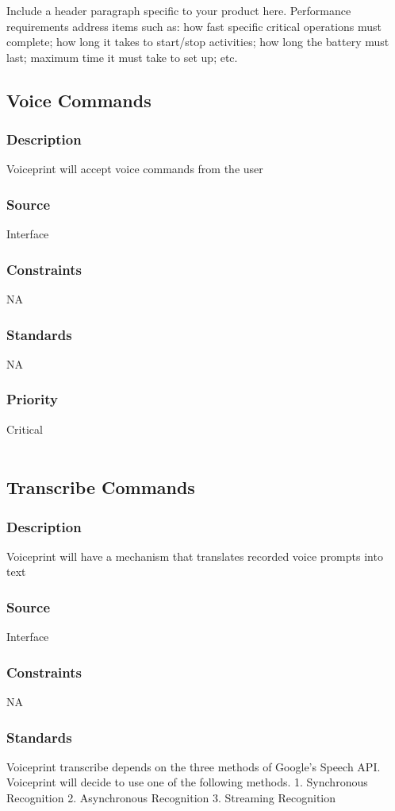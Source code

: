 Include a header paragraph specific to your product here. Performance requirements address items such as: how fast specific critical operations must complete; how long it takes to start/stop activities; how long the battery must last; maximum time it must take to set up; etc.

\subsection{Voice Commands}
\subsubsection{Description}
Voiceprint will accept voice commands from the user
\subsubsection{Source}
Interface
\subsubsection{Constraints}
NA
\subsubsection{Standards}
NA
\subsubsection{Priority}
Critical \\
\\
\subsection{Transcribe Commands}
\subsubsection{Description}
Voiceprint will have a mechanism that translates recorded voice prompts into text
\subsubsection{Source}
Interface
\subsubsection{Constraints}
NA
\subsubsection{Standards}
Voiceprint transcribe depends on the three methods of Google's Speech API. Voiceprint will decide to use one of the following methods.
1. Synchronous Recognition
2. Asynchronous Recognition
3. Streaming Recognition
